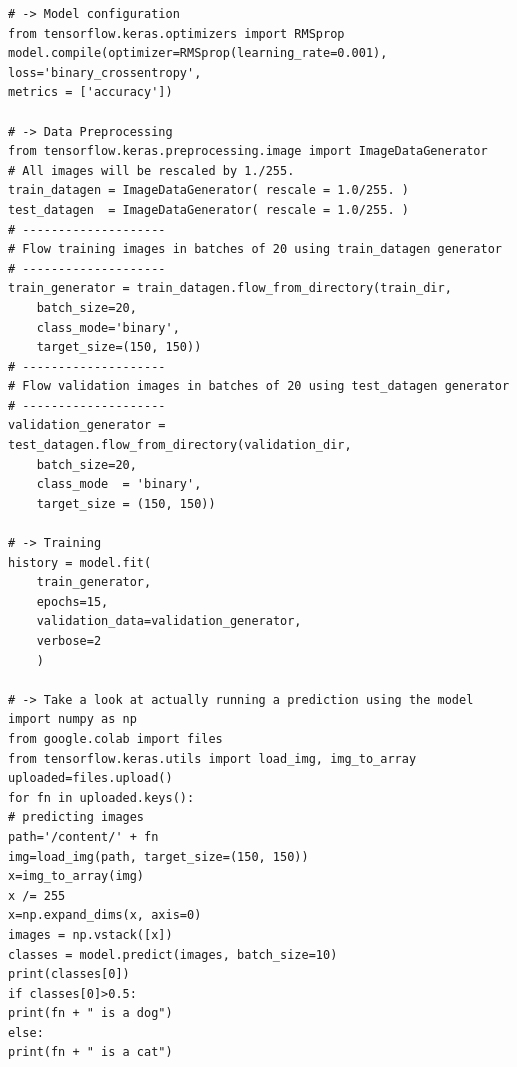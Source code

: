 \documentclass[20pt]{article}
\begin{document}
\begin{itemize}
\begin{verbatim}
# -> Model configuration
from tensorflow.keras.optimizers import RMSprop
model.compile(optimizer=RMSprop(learning_rate=0.001),
loss='binary_crossentropy',
metrics = ['accuracy'])

# -> Data Preprocessing
from tensorflow.keras.preprocessing.image import ImageDataGenerator
# All images will be rescaled by 1./255.
train_datagen = ImageDataGenerator( rescale = 1.0/255. )
test_datagen  = ImageDataGenerator( rescale = 1.0/255. )
# --------------------
# Flow training images in batches of 20 using train_datagen generator
# --------------------
train_generator = train_datagen.flow_from_directory(train_dir,
	batch_size=20,
	class_mode='binary',
	target_size=(150, 150))     
# --------------------
# Flow validation images in batches of 20 using test_datagen generator
# --------------------
validation_generator =  test_datagen.flow_from_directory(validation_dir,
	batch_size=20,
	class_mode  = 'binary',
	target_size = (150, 150))

# -> Training
history = model.fit(
	train_generator,
	epochs=15,
	validation_data=validation_generator,
	verbose=2
	)
	
# -> Take a look at actually running a prediction using the model
import numpy as np
from google.colab import files
from tensorflow.keras.utils import load_img, img_to_array
uploaded=files.upload()
for fn in uploaded.keys():
# predicting images
path='/content/' + fn
img=load_img(path, target_size=(150, 150))
x=img_to_array(img)
x /= 255
x=np.expand_dims(x, axis=0)
images = np.vstack([x])
classes = model.predict(images, batch_size=10)
print(classes[0])
if classes[0]>0.5:
print(fn + " is a dog")
else:
print(fn + " is a cat")


\end{verbatim}
\end{itemize}
\end{document}
